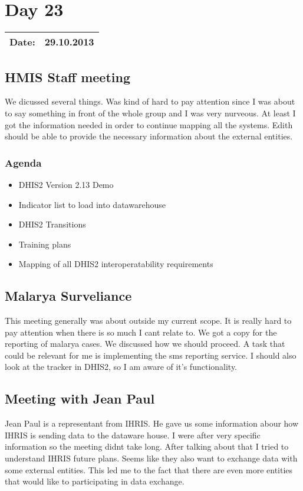 \section{Day 23}
\begin{tabular}{|c|c|}
\hline
Date: & 29.10.2013 \\
\hline
\end{tabular}
\subsection{HMIS Staff meeting}
We dicussed several things. Was kind of hard to pay attention since I was about to say something in front of the whole group and I was very nurveous. At least I got the information needed in order to continue mapping all the systems. Edith should be able to provide the necessary information about the external entities. 
\subsubsection{Agenda}
\begin{itemize}
	\item DHIS2 Version 2.13 Demo
	\item Indicator list to load into datawarehouse
	\item DHIS2 Transitions
	\item Training plans
	\item Mapping of all DHIS2 interoperatability requirements
\end{itemize}
\subsection{Malarya Surveliance}
This meeting generally was about outside my current scope. It is really hard to pay attention when there is so much I cant relate to. We got a copy for the reporting of malarya cases. We discussed how we should proceed. A task that could be relevant for me is implementing the sms reporting service. I should also look at the tracker in DHIS2, so I am aware of it's functionality.
\subsection{Meeting with Jean Paul}
Jean Paul is a representant from IHRIS. He gave us some information abour how IHRIS is sending data to the dataware house.
I were after very specific information so the meeting didnt take long. 
After talking about that I tried to understand IHRIS future plans. Seems like they also want to exchange data with some external entities. This led me to the fact that there are even more entities that would like to participating in data exchange.
